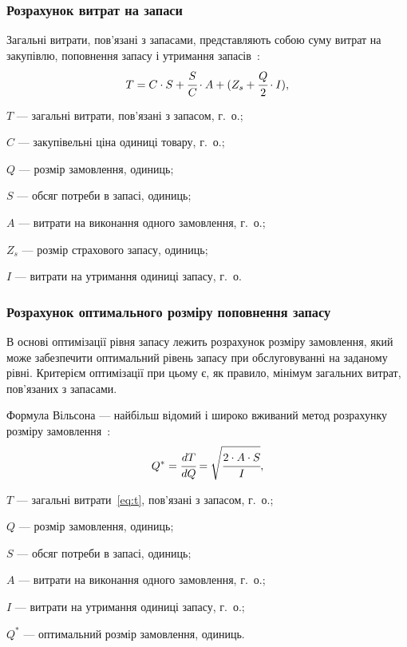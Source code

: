 \subsubsection{Розрахунок витрат на запаси}
Загальні витрати, пов'язані з запасами, представляють собою суму витрат на закупівлю, поповнення запасу і утримання запасів~\cite{Sterligova2008}:
\begin{equation} \label{eq:t}
T=C\cdot S+\cfrac{S}{C}\cdot A+(Z_s+\cfrac{Q}{2}\cdot I)
,
\end{equation}
\begin{description}
	\item[де] $T$ --- загальні витрати, пов'язані з запасом, г.~о.;
	\item $C$ --- закупівельні ціна одиниці товару, г.~о.;
	\item $Q$ --- розмір замовлення, одиниць;
	\item $S$ --- обсяг потреби в запасі, одиниць;
	\item $A$ --- витрати на виконання одного замовлення, г.~о.;
	\item $Z_s$ --- розмір страхового запасу, одиниць;
	\item $I$ --- витрати на утримання одиниці запасу, г.~о.
\end{description}

\subsubsection{Розрахунок оптимального розміру поповнення запасу}
В основі оптимізації рівня запасу лежить розрахунок розміру замовлення, який може забезпечити оптимальний рівень запасу при обслуговуванні на заданому рівні.
Критерієм оптимізації при цьому є, як правило, мінімум загальних витрат, пов'язаних з запасами.

Формула Вільсона --- найбільш відомий і широко вживаний метод розрахунку розміру замовлення~\cite{Sterligova2008}:
\begin{equation}
Q^*=\cfrac{dT}{dQ}=\sqrt{\cfrac{2\cdot A\cdot S}{I}}
,
\end{equation}
\begin{description}
	\item[де] $T$ --- загальні витрати~\eqref{eq:t}, пов'язані з запасом, г.~о.;
	\item $Q$ --- розмір замовлення, одиниць;
	\item $S$ --- обсяг потреби в запасі, одиниць;
	\item $A$ --- витрати на виконання одного замовлення, г.~о.;
	\item $I$ --- витрати на утримання одиниці запасу, г.~о.;
	\item $Q^*$ --- оптимальний розмір замовлення, одиниць.
\end{description}

